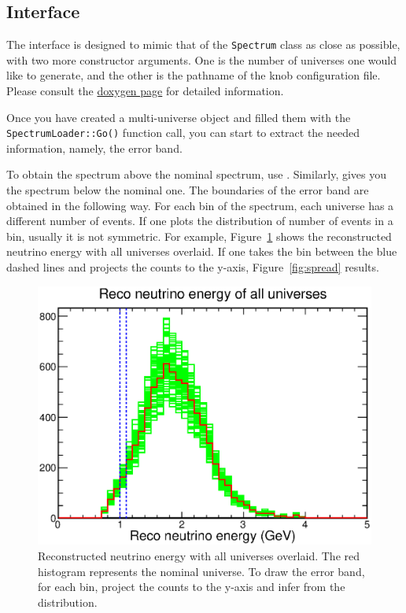 \documentclass[12pt,a4paper,final]{iopart}
\begin{document}
\subsection{Interface}
The interface is designed to mimic that of the \texttt{Spectrum} class as close as possible, with two more constructor arguments. One is the number of universes one would like to generate, and the other is the pathname of the knob configuration file. Please consult the \href{http://nusoft.fnal.gov/nova/novasoft/doxygen/html/classana_1_1MultiverseSpectra.html}{doxygen page} for detailed information.

Once you have created a multi-universe object and filled them with the \texttt{SpectrumLoader::Go()} function call, you can start to extract the needed information, namely, the error band.

To obtain the spectrum above the nominal spectrum, use . Similarly,  gives you the spectrum below the nominal one. The boundaries of the error band are obtained in the following way. For each bin of the spectrum, each universe has a different number of events. If one plots the distribution of number of events in a bin, usually it is not symmetric. For example, Figure~\ref{fig:recoe} shows the reconstructed neutrino energy with all universes overlaid. If one takes the bin between the blue dashed lines and projects the counts to the y-axis, Figure~\ref{fig:spread} results.

\begin{figure}[h]
  \centering
  \includegraphics[width=.75\textwidth]{figures/bin_projection.eps}
  \caption{Reconstructed neutrino energy with all universes overlaid. The red histogram represents the nominal universe. To draw the error band, for each bin, project the counts to the y-axis and infer from the distribution.}
  \label{fig:recoe}
\end{figure}
\end{document}

